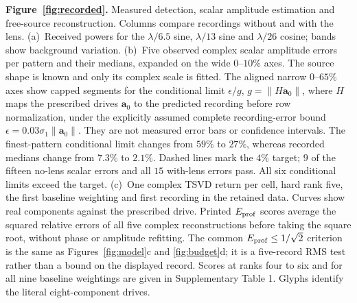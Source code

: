 \documentclass[lineno,pdflatex,sn-nature]{sn-jnl}%
\theoremstyle{thmstyleone}%
\theoremstyle{thmstyletwo}%
\theoremstyle{thmstylethree}%
\begin{document}
\noindent\textbf{Figure~\ref{fig:recorded}.} Measured detection, scalar amplitude estimation and free-source reconstruction. Columns compare recordings without and with the lens. (a)~Received powers for the $\lambda/6.5$ sine, $\lambda/13$ sine and $\lambda/26$ cosine; bands show background variation. (b)~Five observed complex scalar amplitude errors per pattern and their medians, expanded on the wide $0$--$10\%$ axes. The source shape is known and only its complex scale is fitted. The aligned narrow $0$--$65\%$ axes show capped segments for the conditional limit $\epsilon/g$, $g=\|H\mathbf a_0\|$, where $H$ maps the prescribed drives $\mathbf a_0$ to the predicted recording before row normalization, under the explicitly assumed complete recording-error bound $\epsilon=0.03\sigma_1\|\mathbf a_0\|$. They are not measured error bars or confidence intervals. The finest-pattern conditional limit changes from $59\%$ to $27\%$, whereas recorded medians change from $7.3\%$ to $2.1\%$. Dashed lines mark the $4\%$ target; $9$ of the fifteen no-lens scalar errors and all $15$ with-lens errors pass. All six conditional limits exceed the target. (c)~One complex TSVD return per cell, hard rank five, the first baseline weighting and first recording in the retained data. Curves show real components against the prescribed drive. Printed $E_{\rm prof}$ scores average the squared relative errors of all five complex reconstructions before taking the square root, without phase or amplitude refitting. The common $E_{\rm prof}\le1/\sqrt2$ criterion is the same as Figures~\ref{fig:model}c and \ref{fig:budget}d; it is a five-record RMS test rather than a bound on the displayed record. Scores at ranks four to six and for all nine baseline weightings are given in Supplementary Table 1. Glyphs identify the literal eight-component drives.
\par
\end{document}
